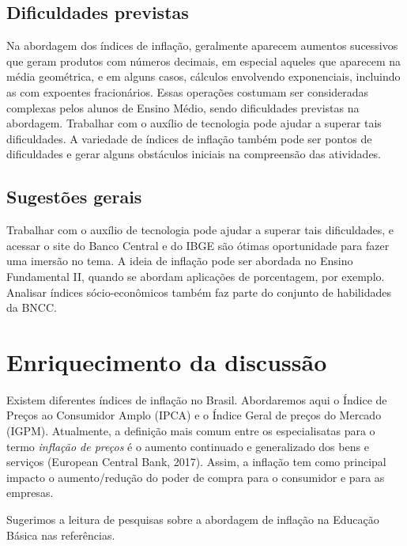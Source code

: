 \begin{paginatexto}
\subsection{Dificuldades previstas} Na abordagem dos índices de inflação, geralmente aparecem aumentos sucessivos que geram produtos com números decimais, em especial aqueles que aparecem na média geométrica, e em alguns casos, cálculos envolvendo exponenciais, incluindo as com expoentes fracionários. Essas operações costumam ser consideradas complexas pelos alunos de Ensino Médio, sendo dificuldades previstas na abordagem. Trabalhar com o auxílio de tecnologia pode ajudar a superar tais dificuldades. A variedade de índices de inflação também pode ser pontos de dificuldades e gerar alguns obstáculos iniciais na compreensão das atividades.

\subsection{Sugestões gerais} Trabalhar com o auxílio de tecnologia pode ajudar a superar tais dificuldades, e acessar o site do Banco Central e do IBGE são ótimas oportunidade para fazer uma imersão no tema. A ideia de inflação pode ser abordada no Ensino Fundamental II, quando se abordam aplicações de porcentagem, por exemplo. Analisar índices sócio-econômicos também faz parte do conjunto de habilidades da BNCC.

\section*{Enriquecimento da discussão}

Existem diferentes índices de inflação no Brasil. Abordaremos aqui o Índice de Preços ao Consumidor Amplo (IPCA) e o Índice Geral de preços do Mercado (IGPM). Atualmente, a definição mais comum entre os especialisatas para o termo \textit{inflação de preços} é o aumento continuado e generalizado dos bens e serviços (European Central Bank, 2017). Assim, a inflação tem como principal impacto o aumento/redução do poder de compra para o consumidor e para as empresas.

Sugerimos a leitura de pesquisas sobre a abordagem de inflação na Educação Básica nas referências.
\end{paginatexto}


